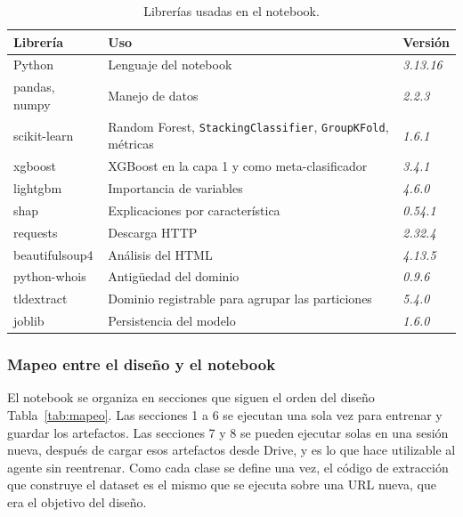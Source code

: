 \begin{table}[ht]
\caption{Librerías usadas en el notebook.}
\label{tab:librerias}
\centering
\footnotesize
\renewcommand{\arraystretch}{1.15}
\begin{tabular}{p{2.3cm} p{4.4cm} p{1.4cm}}
\hline
\textbf{Librería} & \textbf{Uso} & \textbf{Versión}\\
\hline
Python & Lenguaje del notebook & \textit{3.13.16}\\
pandas, numpy & Manejo de datos & \textit{2.2.3}\\
scikit-learn & Random Forest, \texttt{StackingClassifier}, \texttt{GroupKFold}, métricas & \textit{1.6.1}\\
xgboost & XGBoost en la capa 1 y como meta-clasificador & \textit{3.4.1}\\
lightgbm & Importancia de variables & \textit{4.6.0}\\
shap & Explicaciones por característica & \textit{0.54.1}\\
requests & Descarga HTTP & \textit{2.32.4}\\
beautifulsoup4 & Análisis del HTML & \textit{4.13.5}\\
python-whois & Antigüedad del dominio & \textit{0.9.6}\\
tldextract & Dominio registrable para agrupar las particiones & \textit{5.4.0}\\
joblib & Persistencia del modelo & \textit{1.6.0}\\
\hline
\end{tabular}
\end{table}

\subsubsection{Mapeo entre el diseño y el notebook}

El notebook se organiza en secciones que siguen el orden del diseño Tabla~\ref{tab:mapeo}. Las secciones 1 a 6 se ejecutan una sola vez para entrenar y guardar los artefactos. Las secciones 7 y 8 se pueden ejecutar solas en una sesión nueva, después de cargar esos artefactos desde Drive, y es lo que hace utilizable al agente sin reentrenar. Como cada clase se define una vez, el código de extracción que construye el dataset es el mismo que se ejecuta sobre una URL nueva, que era el objetivo del diseño. \newline

